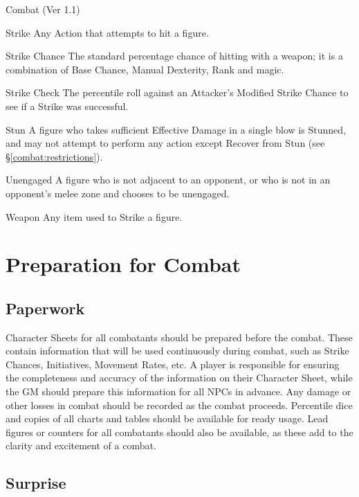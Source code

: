 \begin{Chapter}{Combat (Ver 1.1)}
\begin{Description}
\item[Strike] Any Action that attempts to hit a figure.

\item[Strike Chance] The standard percentage chance of hitting with a
  weapon; it is a combination of Base Chance, Manual Dexterity, Rank
  and magic.

\item[Strike Check] The percentile roll against an Attacker’s Modified
  Strike Chance to see if a Strike was successful.

\item[Stun] A figure who takes sufficient Effective Damage in a single
  blow is Stunned, and may not attempt to perform any action except
  Recover from Stun (see \S\ref{combat:restrictions}).

\item[Unengaged] A figure who is not adjacent to an opponent, or who
  is not in an opponent’s melee zone and chooses to be unengaged.

\item[Weapon] Any item used to Strike a figure. 

\end{Description}
  
\section{Preparation for Combat}
\label{combat:preparation}

\subsection{Paperwork}

Character Sheets for all combatants should be prepared before the
combat.  These contain information that will be used continuously
during combat, such as Strike Chances, Initiatives, Movement Rates,
etc. A player is responsible for ensuring the completeness and
accuracy of the information on their Character Sheet, while the GM
should prepare this information for all NPCs in advance.  Any damage
or other losses in combat should be recorded as the combat
proceeds. Percentile dice and copies of all charts and tables should
be available for ready usage.  Lead figures or counters for all
combatants should also be available, as these add to the clarity and
excitement of a combat.

\subsection{Surprise}


\end{Chapter}
